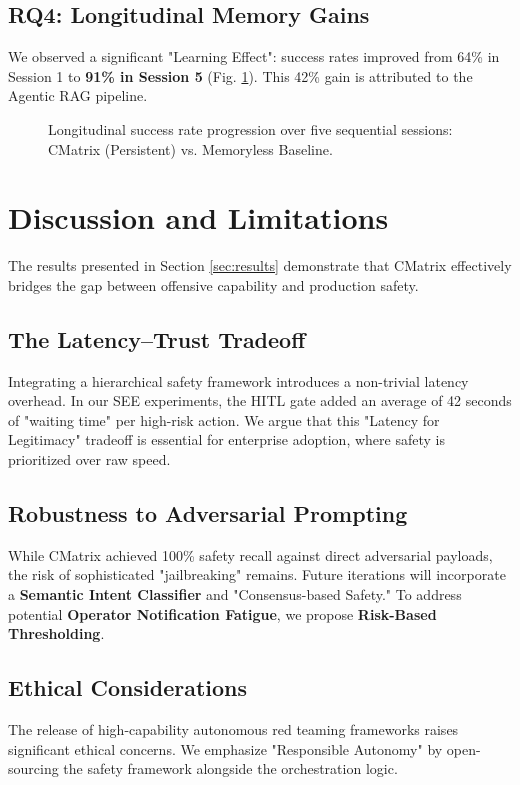 \documentclass[conference]{IEEEtran}
\begin{document}
\subsection{RQ4: Longitudinal Memory Gains}
We observed a significant "Learning Effect": success rates improved from 64\% in Session 1 to \textbf{91\% in Session 5} (Fig. \ref{fig:memory_gain}). This 42\% gain is attributed to the Agentic RAG pipeline.

\begin{figure}[h]
\centering

\caption{Longitudinal success rate progression over five sequential sessions: CMatrix (Persistent) vs. Memoryless Baseline.}
\label{fig:memory_gain}
\end{figure}

\section{Discussion and Limitations}
\label{sec:discussion}

The results presented in Section \ref{sec:results} demonstrate that CMatrix effectively bridges the gap between offensive capability and production safety.

\subsection{The Latency--Trust Tradeoff}
Integrating a hierarchical safety framework introduces a non-trivial latency overhead. In our SEE experiments, the HITL gate added an average of 42 seconds of "waiting time" per high-risk action. We argue that this "Latency for Legitimacy" tradeoff is essential for enterprise adoption, where safety is prioritized over raw speed.

\subsection{Robustness to Adversarial Prompting}
While CMatrix achieved 100\% safety recall against direct adversarial payloads, the risk of sophisticated "jailbreaking" remains. Future iterations will incorporate a \textbf{Semantic Intent Classifier} and "Consensus-based Safety." To address potential \textbf{Operator Notification Fatigue}, we propose \textbf{Risk-Based Thresholding}.

\subsection{Ethical Considerations}
The release of high-capability autonomous red teaming frameworks raises significant ethical concerns. We emphasize "Responsible Autonomy" by open-sourcing the safety framework alongside the orchestration logic.
\end{document}
